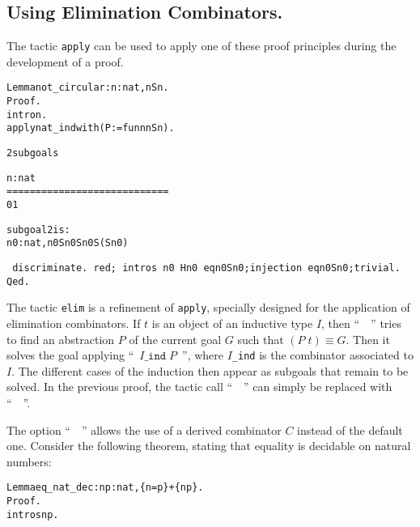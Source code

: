 \documentclass[11pt]{article}
\newcommand{\refmancite}[1]{{}}
\newtheorem{exercise}{Exercise}[section]
\begin{document}
%

\subsection{Using Elimination Combinators.}
The tactic \texttt{apply} can be used to apply one of these proof
principles during the development of a proof.

\begin{alltt}
Lemma not_circular : {\prodsym} n:nat, n {\coqdiff} S n.
Proof.
 intro n.
 apply nat_ind with (P:= fun n {\funarrow} n {\coqdiff} S n).
\it



2 subgoals

  n : nat
  ============================
   0 {\coqdiff} 1


subgoal 2 is:
 {\prodsym} n0 : nat, n0 {\coqdiff} S n0 {\arrow} S n0 {\coqdiff} S (S n0)

\tt
 discriminate.
 red; intros n0 Hn0 eqn0Sn0;injection eqn0Sn0;trivial.
Qed.
\end{alltt}

The tactic \texttt{elim} \refmancite{Section \ref{Elim}} is a
refinement of \texttt{apply}, specially designed for the application
of elimination combinators.  If $t$ is an object of an inductive type
$I$, then ``~~'' tries to find an abstraction $P$ of the
current goal $G$ such that $(P\;t)\equiv G$. Then it solves the goal
applying ``~$I\texttt{\_ind}\;P$~'', where $I$\texttt{\_ind} is the
combinator associated to $I$.  The different cases of the induction
then appear as subgoals that remain to be solved.
In the previous proof, the tactic call ``~~'' can simply be replaced with ``~~''.

The option ``~~''
 allows the use of a
derived combinator $C$ instead of the default one. Consider the
following theorem, stating that equality is decidable on natural
numbers:

\label{iseqpage}
\begin{alltt}
Lemma eq_nat_dec : {\prodsym} n p:nat, \{n=p\}+\{n {\coqdiff} p\}.
Proof.
 intros n p.
\end{alltt}
\end{document}
